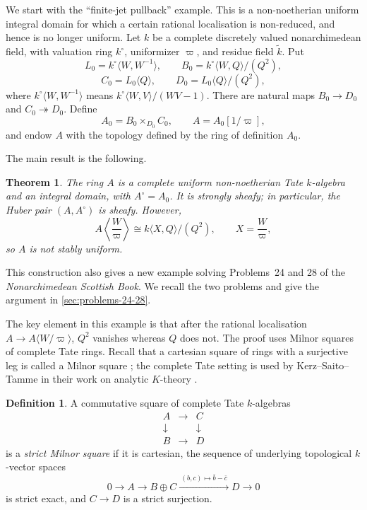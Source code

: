 \documentclass[11pt,reqno]{amsart}
\newtheorem{theorem}{Theorem}[section]
\theoremstyle{definition}
\newtheorem{definition}[definition]{Definition}
\newcommand{\onto}{\twoheadrightarrow}
\begin{document}
We start with the ``finite-jet pullback'' example.
This is a non-noetherian uniform integral domain for which a certain rational
localisation is non-reduced, and hence is no longer uniform.  Let $k$ be a
complete discretely valued nonarchimedean field, with valuation ring
$k^\circ$, uniformizer $\varpi$, and residue field $\widetilde{k}$.  Put
\[
  L_0=k^\circ\langle W,W^{-1}\rangle,
  \qquad
  B_0=k^\circ\langle W,Q\rangle/(Q^2),
\]
\[
  C_0=L_0\langle Q\rangle,
  \qquad
  D_0=L_0\langle Q\rangle/(Q^2),
\]
where $k^\circ\langle W,W^{-1}\rangle$ means
$k^\circ\langle W,V\rangle/(WV-1)$.  There are natural maps
$B_0\to D_0$ and $C_0\onto D_0$.  Define
\[
  A_0=B_0\times_{D_0}C_0,
  \qquad
  A=A_0[1/\varpi],
\]
and endow $A$ with the topology defined by the ring of definition $A_0$.

The main result is the following.

\begin{theorem}\label{thm:main}
The ring $A$ is a complete uniform non-noetherian Tate $k$-algebra and an
integral domain, with $A^\circ=A_0$.  It is strongly sheafy; in particular,
the Huber pair $(A,A^\circ)$ is sheafy.
However,
\[
  A\left\langle \frac{W}{\varpi}\right\rangle
  \cong k\langle X,Q\rangle/(Q^2),
  \qquad X=\frac{W}{\varpi},
\]
so $A$ is not stably uniform.
\end{theorem}

This construction also gives a new example solving Problems~24 and 28 of the
\emph{Nonarchimedean Scottish Book}.  We recall the two problems and give the
argument in \cref{sec:problems-24-28}.

The key element in this example is that after the rational localisation
$A\to A\langle W/\varpi\rangle$, $Q^2$ vanishes whereas $Q$ does not. The proof uses Milnor squares of complete Tate rings.  Recall that a cartesian square of
rings with a surjective leg is called a Milnor square \cite[Section~2]{Milnor}; the
complete Tate setting is used by Kerz--Saito--Tamme in their work on analytic
$K$-theory \cite[Section~3]{KST}.

\begin{definition}\label{def:strict-milnor}
A commutative square of complete Tate $k$-algebras
\[
\begin{matrix}
A&\longrightarrow&C\\
\downarrow&&\downarrow\\
B&\longrightarrow&D
\end{matrix}
\]
is a \emph{strict Milnor square} if it is cartesian, the sequence of underlying topological $k$-vector spaces
\[
  0\longrightarrow A\longrightarrow B\oplus C
  \xrightarrow{\ (b,c)\mapsto \bar b-\bar c\ }D\longrightarrow 0
\]
is strict exact, and $C\to D$ is a strict surjection.
\end{definition}
\end{document}
